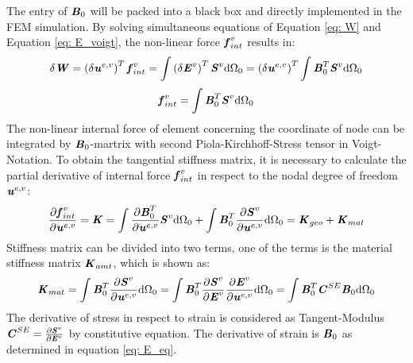 The entry of $\textbf{\textit{B}}_0$ will be packed into a black box and directly implemented in the FEM simulation. By solving simultaneous equations of Equation \ref{eq: W} and Equation \ref{eq: E_voigt}, the non-linear force $\textbf{\textit{f}}_{int}^v$ results in:
\begin{equation}
\delta \textbf{\textit{W}} = \left(\delta \textbf{\textit{u}}^{e,v}\right)^T \textbf{\textit{f}}_{int}^v = \int \left(\delta \textbf{\textit{E}}^v\right)^T \textbf{\textit{S}}^v \mathrm{d}\Omega_0 = \left( \delta \textbf{\textit{u}}^{e,v}\right)^T \int \textbf{\textit{B}}_0^T \textbf{\textit{S}}^v \mathrm{d}\Omega_0
\end{equation}
\begin{equation}
\textbf{\textit{f}}_{int}^v = \int \textbf{\textit{B}}_0^T \textbf{\textit{S}}^v \mathrm{d}\Omega_0
\end{equation}
The non-linear internal force of element concerning the coordinate of node can be integrated by $\textbf{\textit{B}}_0$-martrix with second Piola-Kirchhoff-Stress tensor in Voigt-Notation. To obtain the tangential stiffness matrix, it is necessary to calculate the partial derivative of internal force $\textbf{\textit{f}}_{int}^v$ in respect to the nodal degree of freedom $\textbf{\textit{u}}^{e,v}$:
\begin{equation} \label{K}
\frac{\partial \textbf{\textit{f}}_{int}^v}{\partial \textbf{\textit{u}}^{e,v}} = \textbf{\textit{K}} = \int \frac{\partial \textbf{\textit{B}}_0^T}{\partial \textbf{\textit{u}}^{e,v}} \textbf{\textit{S}}^v \mathrm{d}\Omega_0 + \int \textbf{\textit{B}}_0^T \frac{\partial \textbf{\textit{S}}^v}{\partial \textbf{\textit{u}}^{e,v}} \mathrm{d}\Omega_0 = \textbf{\textit{K}}_{geo} + \textbf{\textit{K}}_{mat}
\end{equation}
Stiffness matrix can be divided into two terms, one of the terms is the material stiffness matrix $\textbf{\textit{K}}_{amt}$, which is shown as:
\begin{equation}
\textbf{\textit{K}}_{mat} = \int \textbf{\textit{B}}_0^T \frac{\partial \textbf{\textit{S}}^v}{\partial \textbf{\textit{u}}^{e,v}}\mathrm{d}\Omega_0 = \int \textbf{\textit{B}}_0^T\frac{\partial \textbf{\textit{S}}^v}{\partial \textbf{\textit{E}}^v} \frac{\partial \textbf{\textit{E}}^v}{\partial \textbf{\textit{u}}^{e,v}} \mathrm{d}\Omega_0 = \int \textbf{\textit{B}}_0^T \textbf{\textit{C}}^{SE} \textbf{\textit{B}}_0 \mathrm{d}\Omega_0
\end{equation}
The derivative of stress in respect to strain is considered as Tangent-Modulus $\textbf{\textit{C}}^{SE} = \frac{\partial \textbf{\textit{S}}^v}{\partial \textbf{\textit{E}}^v}$ by constitutive equation. The derivative of strain is $\textbf{\textit{B}}_0$ as determined in equation \ref{eq: E_eq}. \\
